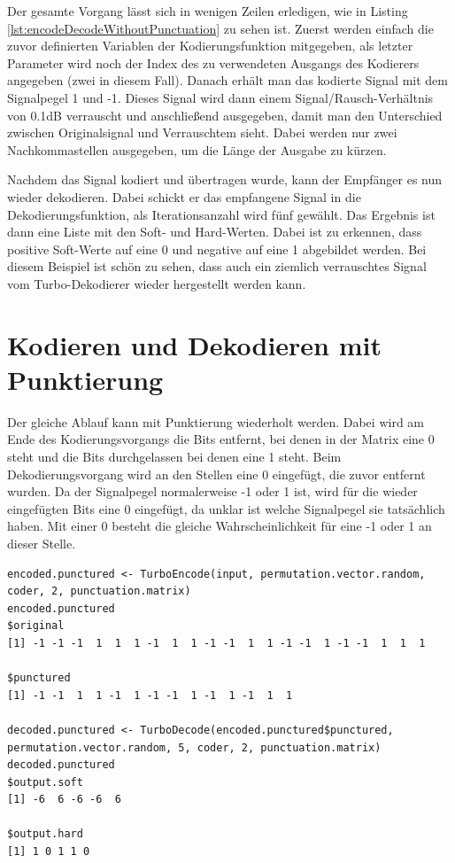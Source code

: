 Der gesamte Vorgang lässt sich in wenigen Zeilen erledigen, wie in Listing \ref{lst:encodeDecodeWithoutPunctuation} zu sehen ist. Zuerst werden einfach die zuvor definierten Variablen der Kodierungsfunktion mitgegeben, als letzter Parameter wird noch der Index des zu verwendeten Ausgangs des Kodierers angegeben (zwei in diesem Fall). Danach erhält man das kodierte Signal mit dem Signalpegel 1 und -1. Dieses Signal wird dann einem Signal/Rausch-Verhältnis von 0.1dB  verrauscht und anschließend ausgegeben, damit man den Unterschied zwischen Originalsignal und Verrauschtem sieht. Dabei werden nur zwei Nachkommastellen ausgegeben, um die Länge der Ausgabe zu kürzen. 

Nachdem das Signal kodiert und übertragen wurde, kann der Empfänger es nun wieder dekodieren. Dabei schickt er das empfangene Signal in die Dekodierungsfunktion, als Iterationsanzahl wird fünf gewählt. Das Ergebnis ist dann eine Liste mit den Soft- und Hard-Werten. Dabei ist zu erkennen, dass positive Soft-Werte auf eine 0 und negative auf eine 1 abgebildet werden. Bei diesem Beispiel ist schön zu sehen, dass auch ein ziemlich verrauschtes Signal vom Turbo-Dekodierer wieder hergestellt werden kann.
\section{Kodieren und Dekodieren mit Punktierung}
\label{sec:example_withPunctuation}

Der gleiche Ablauf kann mit Punktierung wiederholt werden. Dabei wird am Ende des Kodierungsvorgangs die Bits entfernt, bei denen in der Matrix eine 0 steht und die Bits durchgelassen bei denen eine 1 steht. Beim Dekodierungsvorgang wird an den Stellen eine 0 eingefügt, die zuvor entfernt wurden. Da der Signalpegel normalerweise -1 oder 1 ist, wird für die wieder eingefügten Bits eine 0 eingefügt, da unklar ist welche Signalpegel sie tatsächlich haben. Mit einer 0 besteht die gleiche Wahrscheinlichkeit für eine -1 oder 1 an dieser Stelle.

\begin{lstlisting}[caption=Kodierung und Dekodierung mit Punktierung, label={lst:encodeDecodeWithPunctuation}, float=!ht]
encoded.punctured <- TurboEncode(input, permutation.vector.random, coder, 2, punctuation.matrix)
encoded.punctured
$original
[1] -1 -1 -1  1  1  1 -1  1  1 -1 -1  1  1 -1 -1  1 -1 -1  1  1  1

$punctured
[1] -1 -1  1  1 -1  1 -1 -1  1 -1  1 -1  1  1

decoded.punctured <- TurboDecode(encoded.punctured$punctured, permutation.vector.random, 5, coder, 2, punctuation.matrix)
decoded.punctured
$output.soft
[1] -6  6 -6 -6  6

$output.hard
[1] 1 0 1 1 0
\end{lstlisting}

